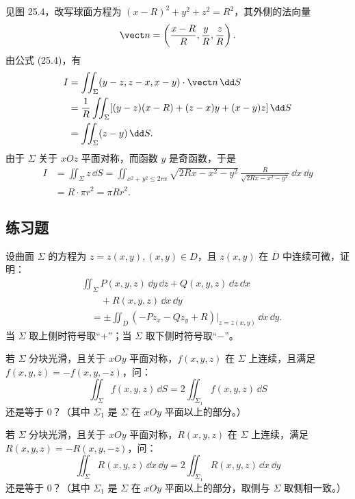 \begin{xsolution}
见图 25.4，改写球面方程为 $(x-R)^2+y^2+z^2=R^2$，其外侧的法向量
\[
  \vect n=\left(\frac{x-R}{R},\frac yR,\frac zR\right).
\]
由公式 (25.4)，有
\begin{align*}
I&=\iint_\Sigma(y-z,z-x,x-y)\cdot\vect n\,\dd S\\
&=\frac1R\iint_\Sigma[(y-z)(x-R)+(z-x)y+(x-y)z]\,\dd S\\
&=\iint_\Sigma(z-y)\,\dd S.
\end{align*}
由于 $\Sigma$ 关于 $xOz$ 平面对称，而函数 $y$ 是奇函数，于是
\begin{align*}
I&=\iint_\Sigma z\,\dd S
=\iint_{x^2+y^2\le2rx}\sqrt{2Rx-x^2-y^2}\,
\frac{R}{\sqrt{2Rx-x^2-y^2}}\,\dd x\,\dd y\\
&=R\cdot\pi r^2=\pi Rr^2.
\end{align*}
\end{xsolution}

\subsection{练习题}

\begin{xexercise}[1]
设曲面 $\Sigma$ 的方程为 $z=z(x,y),(x,y)\in D$，且 $z(x,y)$ 在 $\overline D$ 中连续可微，证明：
\[
\begin{aligned}
  &\iint_\Sigma P(x,y,z)\,\dd y\,\dd z
  +Q(x,y,z)\,\dd z\,\dd x\\
  &\qquad+R(x,y,z)\,\dd x\,\dd y\\
  &\quad=\pm\iint_D(-Pz_x-Qz_y+R)\big|_{z=z(x,y)}\,\dd x\,\dd y.
\end{aligned}
\]
当 $\Sigma$ 取上侧时符号取“$+$”；当 $\Sigma$ 取下侧时符号取“$-$”。
\end{xexercise}

\begin{xexercise}[2]
若 $\Sigma$ 分块光滑，且关于 $xOy$ 平面对称，$f(x,y,z)$ 在 $\Sigma$ 上连续，且满足 $f(x,y,z)=-f(x,y,-z)$，问：
\[
  \iint_\Sigma f(x,y,z)\,\dd S=2\iint_{\Sigma_1}f(x,y,z)\,\dd S
\]
还是等于 $0$？（其中 $\Sigma_1$ 是 $\Sigma$ 在 $xOy$ 平面以上的部分。）
\end{xexercise}

\begin{xexercise}[3]
若 $\Sigma$ 分块光滑，且关于 $xOy$ 平面对称，$R(x,y,z)$ 在 $\Sigma$ 上连续，满足 $R(x,y,z)=-R(x,y,-z)$，问：
\[
  \iint_\Sigma R(x,y,z)\,\dd x\,\dd y=2\iint_{\Sigma_1}R(x,y,z)\,\dd x\,\dd y
\]
还是等于 $0$？（其中 $\Sigma_1$ 是 $\Sigma$ 在 $xOy$ 平面以上的部分，取侧与 $\Sigma$ 取侧相一致。）
\end{xexercise}

